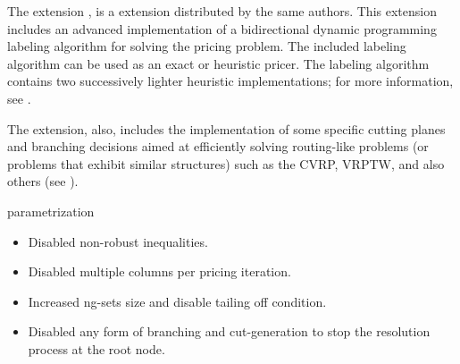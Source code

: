 \begin{frame}{\vrpsolver{}}
	The \vrpsolver{} extension \parencite{pessoa2020generic}, is
	a \bapcod{} extension distributed by the same authors.
	This extension includes an
	advanced implementation of a bidirectional dynamic programming labeling algorithm
	\parencite{sadykov2021bucket} for solving the pricing problem.
	The included labeling algorithm
	can be used as an exact or heuristic pricer.
	The labeling algorithm contains two successively lighter heuristic implementations;
	for more information, see \textcite{sadykov2021bucket}.

	The \vrpsolver{} extension, also,
	includes the implementation of some
	specific cutting planes and branching decisions
	aimed at efficiently solving routing-like problems
	(or problems that exhibit similar structures)
	such as the CVRP, VRPTW, and also others (see \cite{pessoa2020generic}).

\end{frame}

\begin{frame}{\bapcod{} parametrization}
	\begin{itemize}
		\item Disabled non-robust inequalities.
		\item Disabled multiple columns per pricing iteration.
		\item Increased ng-sets size and disable tailing off condition.
		\item Disabled any form of branching and cut-generation to stop the resolution process at the root node.
	\end{itemize}
\end{frame}
